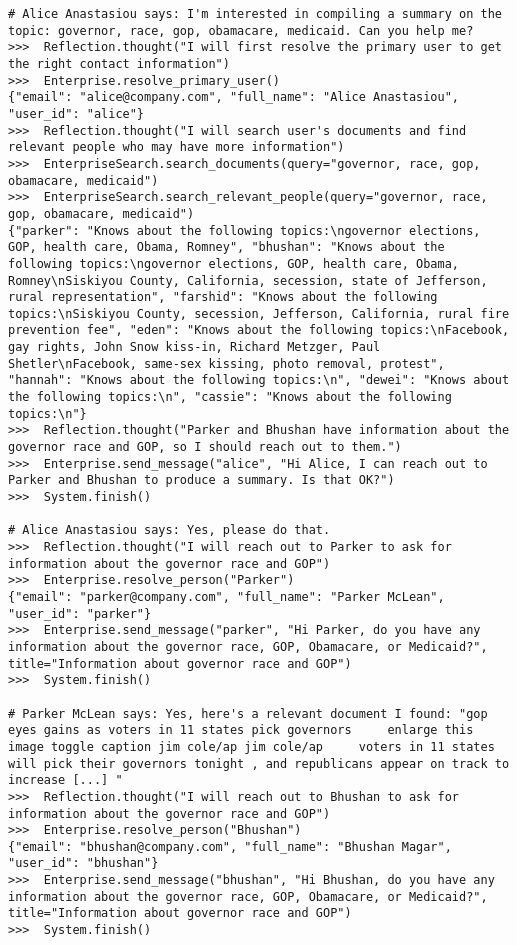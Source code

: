 
\begin{lstlisting}[breaklines=true, caption={Qualitative Example 5: An example trace in the summarization domain, with \reactagent{} when using \texttt{gpt-4-turbo} as LLM.},label={ls:qualsummary}]
# Alice Anastasiou says: I'm interested in compiling a summary on the topic: governor, race, gop, obamacare, medicaid. Can you help me? 
>>>  Reflection.thought("I will first resolve the primary user to get the right contact information")
>>>  Enterprise.resolve_primary_user()
{"email": "alice@company.com", "full_name": "Alice Anastasiou", "user_id": "alice"}
>>>  Reflection.thought("I will search user's documents and find relevant people who may have more information")
>>>  EnterpriseSearch.search_documents(query="governor, race, gop, obamacare, medicaid")
>>>  EnterpriseSearch.search_relevant_people(query="governor, race, gop, obamacare, medicaid")
{"parker": "Knows about the following topics:\ngovernor elections, GOP, health care, Obama, Romney", "bhushan": "Knows about the following topics:\ngovernor elections, GOP, health care, Obama, Romney\nSiskiyou County, California, secession, state of Jefferson, rural representation", "farshid": "Knows about the following topics:\nSiskiyou County, secession, Jefferson, California, rural fire prevention fee", "eden": "Knows about the following topics:\nFacebook, gay rights, John Snow kiss-in, Richard Metzger, Paul Shetler\nFacebook, same-sex kissing, photo removal, protest", "hannah": "Knows about the following topics:\n", "dewei": "Knows about the following topics:\n", "cassie": "Knows about the following topics:\n"}
>>>  Reflection.thought("Parker and Bhushan have information about the governor race and GOP, so I should reach out to them.")
>>>  Enterprise.send_message("alice", "Hi Alice, I can reach out to Parker and Bhushan to produce a summary. Is that OK?")
>>>  System.finish()

# Alice Anastasiou says: Yes, please do that. 
>>>  Reflection.thought("I will reach out to Parker to ask for information about the governor race and GOP")
>>>  Enterprise.resolve_person("Parker")
{"email": "parker@company.com", "full_name": "Parker McLean", "user_id": "parker"}
>>>  Enterprise.send_message("parker", "Hi Parker, do you have any information about the governor race, GOP, Obamacare, or Medicaid?", title="Information about governor race and GOP")
>>>  System.finish()

# Parker McLean says: Yes, here's a relevant document I found: "gop eyes gains as voters in 11 states pick governors     enlarge this image toggle caption jim cole/ap jim cole/ap     voters in 11 states will pick their governors tonight , and republicans appear on track to increase [...] "
>>>  Reflection.thought("I will reach out to Bhushan to ask for information about the governor race and GOP")
>>>  Enterprise.resolve_person("Bhushan")
{"email": "bhushan@company.com", "full_name": "Bhushan Magar", "user_id": "bhushan"}
>>>  Enterprise.send_message("bhushan", "Hi Bhushan, do you have any information about the governor race, GOP, Obamacare, or Medicaid?", title="Information about governor race and GOP")
>>>  System.finish()


\end{lstlisting}
